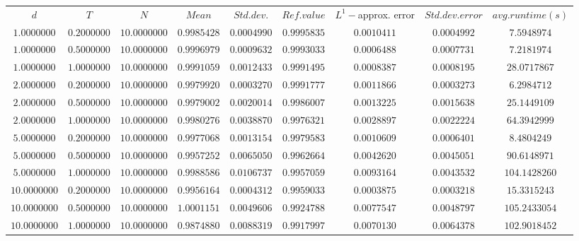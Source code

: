 \begin{tabular}{ccccccccc}
$d$ & $T$ & $N$ & $Mean$ & $Std. dev.$ & $Ref. value$ & $L^1-$approx. error & $Std. dev. error$ & $avg. runtime (s)$\\
$1.0000000$ & $0.2000000$ & $10.0000000$ & $0.9985428$ & $0.0004990$ & $0.9995835$ & $0.0010411$ & $0.0004992$ & $7.5948974$\\
$1.0000000$ & $0.5000000$ & $10.0000000$ & $0.9996979$ & $0.0009632$ & $0.9993033$ & $0.0006488$ & $0.0007731$ & $7.2181974$\\
$1.0000000$ & $1.0000000$ & $10.0000000$ & $0.9991059$ & $0.0012433$ & $0.9991495$ & $0.0008387$ & $0.0008195$ & $28.0717867$\\
$2.0000000$ & $0.2000000$ & $10.0000000$ & $0.9979920$ & $0.0003270$ & $0.9991777$ & $0.0011866$ & $0.0003273$ & $6.2984712$\\
$2.0000000$ & $0.5000000$ & $10.0000000$ & $0.9979002$ & $0.0020014$ & $0.9986007$ & $0.0013225$ & $0.0015638$ & $25.1449109$\\
$2.0000000$ & $1.0000000$ & $10.0000000$ & $0.9980276$ & $0.0038870$ & $0.9976321$ & $0.0028897$ & $0.0022224$ & $64.3942999$\\
$5.0000000$ & $0.2000000$ & $10.0000000$ & $0.9977068$ & $0.0013154$ & $0.9979583$ & $0.0010609$ & $0.0006401$ & $8.4804249$\\
$5.0000000$ & $0.5000000$ & $10.0000000$ & $0.9957252$ & $0.0065050$ & $0.9962664$ & $0.0042620$ & $0.0045051$ & $90.6148971$\\
$5.0000000$ & $1.0000000$ & $10.0000000$ & $0.9988586$ & $0.0106737$ & $0.9957059$ & $0.0093164$ & $0.0043532$ & $104.1428260$\\
$10.0000000$ & $0.2000000$ & $10.0000000$ & $0.9956164$ & $0.0004312$ & $0.9959033$ & $0.0003875$ & $0.0003218$ & $15.3315243$\\
$10.0000000$ & $0.5000000$ & $10.0000000$ & $1.0001151$ & $0.0049606$ & $0.9924788$ & $0.0077547$ & $0.0048797$ & $105.2433054$\\
$10.0000000$ & $1.0000000$ & $10.0000000$ & $0.9874880$ & $0.0088319$ & $0.9917997$ & $0.0070130$ & $0.0064378$ & $102.9018452$\\
\end{tabular}
